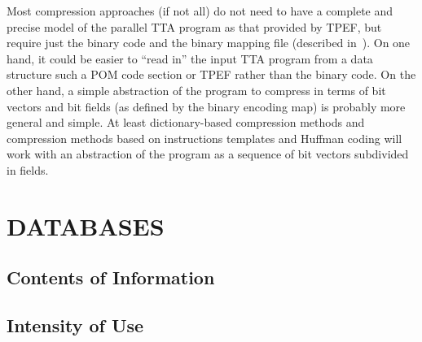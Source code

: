 \documentclass[a4paper,twoside]{tce}
\begin{document}
Most compression approaches (if not all) do not need to have a
complete and precise model of the parallel TTA program as that
provided by TPEF, but require just the binary code and the binary
mapping file (described in~\cite{ProGeSpecs}).
%
On one hand, it could be easier to ``read in'' the input TTA program from a
data structure such a POM code section or TPEF rather than the binary
code. On the other hand, a simple abstraction of the program to compress in
terms of bit vectors and bit fields (as defined by the binary encoding map)
is probably more general and simple.
%
At least dictionary-based compression methods and compression methods based
on instructions templates and Huffman coding will work with an abstraction
of the program as a sequence of bit vectors subdivided in fields.

\chapter{DATABASES}



\section{Contents of Information}


%

%
%


\section{Intensity of Use}
\end{document}
